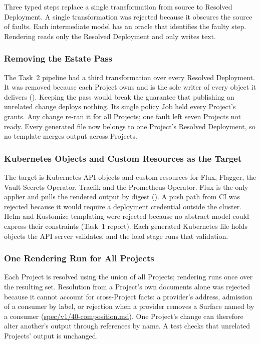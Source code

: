 Three typed steps replace a single transformation from source to Resolved Deployment.
A single transformation was rejected because it obscures the source of faults.
Each intermediate model has an oracle that identifies the faulty step.
Rendering reads only the Resolved Deployment and only writes text.

\subsubsection{Removing the Estate Pass}
\label{sec:shape-estate}

The Task~2 pipeline had a third transformation over every Resolved Deployment. It
was removed because each Project owns and is the sole writer of every object it delivers
(). Keeping the pass
would break the guarantee that publishing an unrelated change deploys nothing. Its
single policy Job held every Project's grants. Any change re-ran it for all Projects;
one fault left seven Projects not ready. Every generated file now belongs to
one Project's Resolved Deployment, so no template merges output across Projects.

\subsubsection{Kubernetes Objects and Custom Resources as the Target}
\label{sec:shape-target}

The target is Kubernetes API objects and custom resources for Flux,
Flagger, the Vault Secrets Operator, Traefik and the Prometheus Operator. Flux is
the only applier and pulls the rendered output by digest
(). A push path from CI
was rejected because it would require a deployment credential outside the cluster. Helm
and Kustomize templating were rejected because no abstract model could express their
constraints (Task~1 report). Each generated Kubernetes file holds objects the API server
validates, and the load stage runs that validation.

\subsubsection{One Rendering Run for All Projects}
\label{sec:shape-union}

Each Project is resolved using the union of all Projects; rendering runs once
over the resulting set. Resolution from a Project's own documents alone
was rejected because it cannot account for cross-Project facts: a provider's address,
admission of a consumer by label, or rejection when a provider removes a Surface named by a consumer
(\url{spec/v1/40-composition.md}). One Project's change can therefore alter
another's output through references by name. A test checks that unrelated Projects' output is unchanged.


